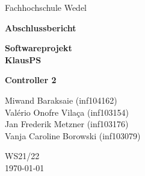 
\begin{titlepage}
    \begin{center}
        \begin{large}
            Fachhochschule Wedel\\

        \end{large}
        \vspace{2cm}
        \begin{huge}
            \textbf{Abschlussbericht}\\
            \bigskip
            \begin{Huge}
                \textbf{Softwareprojekt}\\
                \vspace{0.5cm}
                \textbf{KlausPS}\\
                \vfill
            \end{Huge}
        \end{huge}
        \begin{Large}
            \textbf{Controller 2}\\
        \end{Large}
        \vspace{0.5cm}
        Miwand Baraksaie (inf104162)\\
        Valério Onofre Vilaça (inf103154)\\
        Jan Frederik Metzner (inf103176)\\
        Vanja Caroline Borowski (inf103079)\\
        \bigskip
        \begin{large}
            \vspace{4cm}
        \end{large}
        \bigskip
        WS21/22\\
        \today
        \vfill
    \end{center}
\end{titlepage}